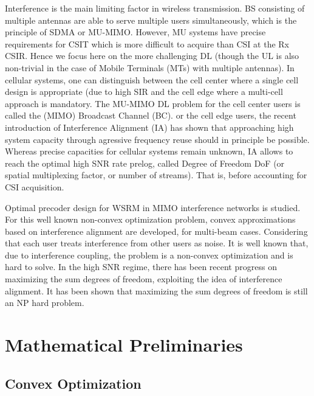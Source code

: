 \documentclass[a4paper, 12pt,titlepage]{dithesis} %
\begin{document}
Interference is the main limiting factor in wireless transmission. \ac{BS} consisting of multiple antennas are able to serve multiple users simultaneously, which is the principle of \ac{SDMA} or \ac{MU-MIMO}. However, \ac{MU} systems have precise requirements for \ac{CSIT} which is more difficult to acquire than \ac{CSI} at the Rx \ac{CSIR}. Hence we focus here on the more challenging \ac{DL} (though the \ac{UL} is also non-trivial in the case of Mobile Terminals (MTs) with multiple antennas). In cellular systems, one can distinguish between the cell center where a single cell design is appropriate (due to high \ac{SIR} and the cell edge where a multi-cell approach is mandatory. The \ac{MU-MIMO} \ac{DL} problem for the cell center users is called the (MIMO) Broadcast Channel (BC). or the cell edge users,  the recent introduction of Interference Alignment (IA) has shown that approaching high system capacity through agressive frequency reuse should in principle be possible.  Whereas precise capacities for cellular systems remain unknown, IA allows to reach the optimal high \ac{SNR} rate prelog, called Degree of Freedom \ac{DoF} (or spatial multiplexing factor, or number of streams). That is, before accounting for \ac{CSI} acquisition.  

Optimal  precoder  design  for  \ac{WSRM} in \ac{MIMO} interference networks  is  studied.  For  this  well  known  non-convex  optimization problem, convex approximations based on interference alignment are developed, for multi-beam cases. Considering that each user treats interference from other users as noise. It is well known that, due to interference coupling, the problem is a non-convex optimization and is hard to solve. In the high \ac{SNR} regime, there has been recent progress on maximizing the sum degrees of freedom, exploiting the idea of interference alignment. It has been shown that maximizing the sum degrees of freedom is  still  an  NP  hard  problem. 




\section{Mathematical Preliminaries}
\subsection{Convex Optimization}
\end{document}
